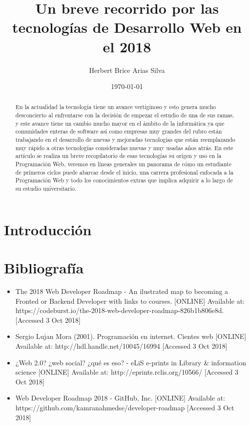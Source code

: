 \documentclass[a4paper]{article}
\title{Un breve recorrido por las tecnologías de Desarrollo Web en el 2018 }
\author{Herbert Brice Arias Silva}
\date{\today}
\begin{document}
\maketitle

\begin{abstract}
   En la actualidad la tecnología tiene un avance vertiginoso y esto genera
   mucho desconcierto al enfrentarse con la decisión de empezar el estudio de
   una de sus ramas, y este avance tiene un cambio mucho mayor en el ámbito de
   la informática ya que comunidades enteras de software así como empresas muy
   grandes del rubro están trabajando en el desarrollo de nuevas y mejoradas
   tecnologías que están reemplazando muy rápido a otras tecnologías
   consideradas nuevas y muy usadas años atrás. En este artículo se realiza un
   breve recopilatorio de esas tecnologías su origen y uso en la Programación
   Web, veremos en líneas generales un panorama de cómo un estudiante de
   primeros ciclos puede abarcar desde el inicio, una carrera profesional
   enfocada a la Programación Web y todo los conocimientos extras que implica
   adquirir a lo largo de su estudio universitario.
\end{abstract}

\section{Introducción}


\section{Bibliografía }

\begin{itemize}
   \item The 2018 Web Developer Roadmap - An ilustrated map to becoming a
      Fronted or Backend Developer with links to courses. [ONLINE] Available
      at: https://codeburst.io/the-2018-web-developer-roadmap-826b1b806e8d.
      [Accessed 3 Oct 2018]
\end{itemize}

\begin{itemize}
   \item Sergio Lujan Mora (2001). Programación en internet. Cientes web [ONLINE] Available
      at: http://hdl.handle.net/10045/16994
      [Accessed 3 Oct 2018]
\end{itemize}

\begin{itemize}
   \item ¿Web 2.0? ¿web social? ¿qué es eso? - eLiS e-prints in Library &
      information science [ONLINE] Available at:
      http://eprints.rclis.org/10566/ [Accessed 3 Oct 2018]
\end{itemize}

\begin{itemize}
   \item Web Developer Roadmap 2018 - GitHub, Inc. [ONLINE] Available at:
      https://github.com/kamranahmedse/developer-roadmap [Accessed 3 Oct 2018]
\end{itemize}




    
\end{document}
